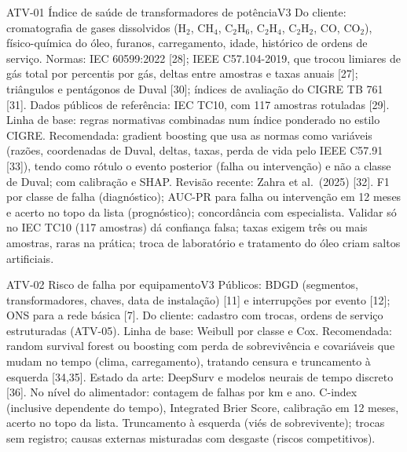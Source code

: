 \begin{ficha}{ATV-01 \textperiodcentered{} Índice de saúde de transformadores de potência}{V3}
 Do cliente: cromatografia de gases dissolvidos (H$_2$, CH$_4$,
C$_2$H$_6$, C$_2$H$_4$, C$_2$H$_2$, CO, CO$_2$), físico-química do óleo,
furanos, carregamento, idade, histórico de ordens de serviço. Normas: IEC
60599:2022 [28]; IEEE C57.104-2019, que trocou limiares de gás total por
percentis por gás, deltas entre amostras e taxas anuais [27]; triângulos e
pentágonos de Duval [30]; índices de avaliação do CIGRE TB 761 [31]. Dados
públicos de referência: IEC TC10, com 117 amostras rotuladas [29].
 Linha de base: regras normativas combinadas num índice
ponderado no estilo CIGRE. Recomendada: gradient boosting que usa as normas
como variáveis (razões, coordenadas de Duval, deltas, taxas, perda de vida
pelo IEEE C57.91 [33]), tendo como rótulo o evento posterior (falha ou
intervenção) e não a classe de Duval; com calibração e SHAP. Revisão recente:
Zahra et al.\ (2025) [32].
 F1 por classe de falha (diagnóstico); AUC-PR para falha ou
intervenção em 12 meses e acerto no topo da lista (prognóstico); concordância
com especialista.
 Validar só no IEC TC10 (117 amostras) dá confiança falsa;
taxas exigem três ou mais amostras, raras na prática; troca de laboratório e
tratamento do óleo criam saltos artificiais.
\end{ficha}

\begin{ficha}{ATV-02 \textperiodcentered{} Risco de falha por equipamento}{V3}
 Públicos: BDGD (segmentos, transformadores, chaves, data de
instalação) [11] e interrupções por evento [12]; ONS para a rede básica [7].
Do cliente: cadastro com trocas, ordens de serviço estruturadas (ATV-05).
 Linha de base: Weibull por classe e Cox. Recomendada:
random survival forest ou boosting com perda de sobrevivência e covariáveis
que mudam no tempo (clima, carregamento), tratando censura e truncamento à
esquerda [34,35]. Estado da arte: DeepSurv e modelos neurais de tempo
discreto [36]. No nível do alimentador: contagem de falhas por km e ano.
 C-index (inclusive dependente do tempo), Integrated Brier
Score, calibração em 12 meses, acerto no topo da lista.
 Truncamento à esquerda (viés de sobrevivente); trocas sem
registro; causas externas misturadas com desgaste (riscos competitivos).
\end{ficha}

